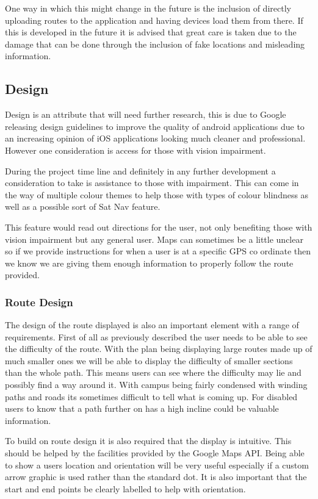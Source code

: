 One way in which this might change in the future is the inclusion of directly uploading routes to the application and having devices load them from there. If this is developed in the future it is advised that great care is taken due to the damage that can be done through the inclusion of fake locations and misleading information. 

\subsection{Design}
Design is an attribute that will need further research, this is due to Google releasing design guidelines to improve the quality of android applications due to an increasing opinion of iOS applications looking much cleaner and professional. However one consideration is access for those with vision impairment.

During the project time line and definitely in any further development a consideration to take is assistance to those with impairment. This can come in the way of multiple colour themes to help those with types of colour blindness as well as a possible sort of Sat Nav feature.

This feature would read out directions for the user, not only benefiting those with vision impairment but any general user. Maps can sometimes be a little unclear so if we provide instructions for when a user is at a specific GPS co ordinate then we know we are giving them enough information to properly follow the route provided. 
\subsubsection{Route Design}
The design of the route displayed is also an important element with a range of requirements. First of all as previously described the user needs to be able to see the difficulty of the route. With the plan being displaying large routes made up of much smaller ones we will be able to display the difficulty of smaller sections than the whole path. This means users can see where the difficulty may lie and possibly find a way around it. With campus being fairly condensed with winding paths and roads its sometimes difficult to tell what is coming up. For disabled users to know that a path further on has a high incline could be valuable information. 

To build on route design it is also required that the display is intuitive. This should be helped by the facilities provided by the Google Maps API. Being able to show a users location and orientation will be very useful especially if a custom arrow graphic is used rather than the standard dot. It is also important that the start and end points be clearly labelled to help with orientation. 
\newpage
